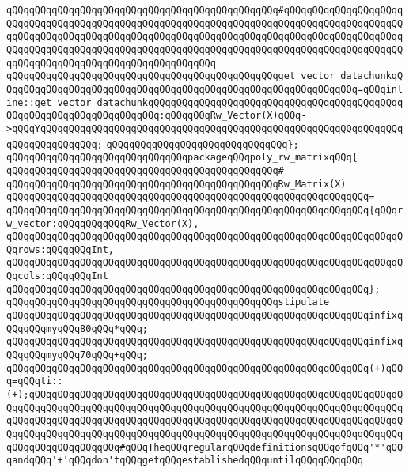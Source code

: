\verb|qQQqqQQqqQQqqQQqqQQqqQQqqQQqqQQqqQQqqQQqqQQqqQQq#qQQqqQQqqQQqqQQqqQQqqQQqqQQqqQQqqQQqqQQqqQQqqQQqqQQqqQQqqQQqqQQqqQQqqQQqqQQqqQQqqQQqqQQqqQQqqQQqqQQqqQQqqQQqqQQqqQQqqQQqqQQqqQQqqQQqqQQqqQQqqQQqqQQqqQQqqQQqqQQqqQQqqQQqqQQqqQQqqQQqqQQqqQQqqQQqqQQqqQQqqQQqqQQqqQQqqQQqqQQqqQQqqQQqqQQqqQQqqQQqqQQqqQQqqQQqqQQqqQQqqQQqqQQq|\newline
\verb|qQQqqQQqqQQqqQQqqQQqqQQqqQQqqQQqqQQqqQQqqQQqqQQqget_vector_datachunkqQQqqQQqqQQqqQQqqQQqqQQqqQQqqQQqqQQqqQQqqQQqqQQqqQQqqQQqqQQqqQQq=qQQqinline::get_vector_datachunkqQQqqQQqqQQqqQQqqQQqqQQqqQQqqQQqqQQqqQQqqQQqqQQqqQQqqQQqqQQqqQQqqQQqqQQq:qQQqqQQqRw_Vector(X)qQQq->qQQqYqQQqqQQqqQQqqQQqqQQqqQQqqQQqqQQqqQQqqQQqqQQqqQQqqQQqqQQqqQQqqQQqqQQqqQQqqQQqqQQq;|\newline
\verb|qQQqqQQqqQQqqQQqqQQqqQQqqQQqqQQq};|\newline
\newline
\verb|qQQqqQQqqQQqqQQqqQQqqQQqqQQqqQQqpackageqQQqpoly_rw_matrixqQQq{|\newline
\verb|qQQqqQQqqQQqqQQqqQQqqQQqqQQqqQQqqQQqqQQqqQQqqQQq#|\newline
\verb|qQQqqQQqqQQqqQQqqQQqqQQqqQQqqQQqqQQqqQQqqQQqqQQqRw_Matrix(X)|\newline
\verb|qQQqqQQqqQQqqQQqqQQqqQQqqQQqqQQqqQQqqQQqqQQqqQQqqQQqqQQqqQQqqQQq=|\newline
\verb|qQQqqQQqqQQqqQQqqQQqqQQqqQQqqQQqqQQqqQQqqQQqqQQqqQQqqQQqqQQqqQQq{qQQqrw_vector:qQQqqQQqqQQqRw_Vector(X),|\newline
\verb|qQQqqQQqqQQqqQQqqQQqqQQqqQQqqQQqqQQqqQQqqQQqqQQqqQQqqQQqqQQqqQQqqQQqqQQqrows:qQQqqQQqInt,|\newline
\verb|qQQqqQQqqQQqqQQqqQQqqQQqqQQqqQQqqQQqqQQqqQQqqQQqqQQqqQQqqQQqqQQqqQQqqQQqcols:qQQqqQQqInt|\newline
\verb|qQQqqQQqqQQqqQQqqQQqqQQqqQQqqQQqqQQqqQQqqQQqqQQqqQQqqQQqqQQqqQQq};|\newline
\newline
\verb|qQQqqQQqqQQqqQQqqQQqqQQqqQQqqQQqqQQqqQQqqQQqqQQqstipulate|\newline
\newline
\verb|qQQqqQQqqQQqqQQqqQQqqQQqqQQqqQQqqQQqqQQqqQQqqQQqqQQqqQQqqQQqqQQqinfixqQQqqQQqmyqQQq80qQQq*qQQq;|\newline
\verb|qQQqqQQqqQQqqQQqqQQqqQQqqQQqqQQqqQQqqQQqqQQqqQQqqQQqqQQqqQQqqQQqinfixqQQqqQQqmyqQQq70qQQq+qQQq;|\newline
\newline
\verb|qQQqqQQqqQQqqQQqqQQqqQQqqQQqqQQqqQQqqQQqqQQqqQQqqQQqqQQqqQQqqQQq(+)qQQq=qQQqti::(+);qQQqqQQqqQQqqQQqqQQqqQQqqQQqqQQqqQQqqQQqqQQqqQQqqQQqqQQqqQQqqQQqqQQqqQQqqQQqqQQqqQQqqQQqqQQqqQQqqQQqqQQqqQQqqQQqqQQqqQQqqQQqqQQqqQQqqQQqqQQqqQQqqQQqqQQqqQQqqQQqqQQqqQQqqQQqqQQqqQQqqQQqqQQqqQQqqQQqqQQqqQQqqQQqqQQqqQQqqQQqqQQqqQQqqQQqqQQqqQQqqQQqqQQqqQQqqQQqqQQqqQQqqQQqqQQqqQQqqQQqqQQqqQQqqQQqqQQq#qQQqTheqQQqregularqQQqdefinitionsqQQqofqQQq'*'qQQqandqQQq'+'qQQqdon'tqQQqgetqQQqestablishedqQQquntilqQQqqQQqqQQq|\newline
